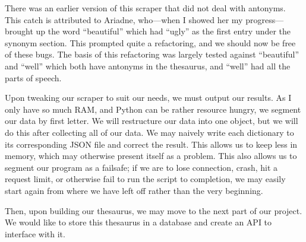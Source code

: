 \documentclass[11pt, twoside, reqno]{book}
\begin{document}
There was an earlier version of this scraper that did not deal with antonyms. This catch is attributed to Ariadne, who—when I showed her my progress—brought up the word ``beautiful'' which had ``ugly'' as the first entry under the synonym section. This prompted quite a refactoring, and we should now be free of these bugs. The basis of this refactoring was largely tested against ``beautiful'' and ``well'' which both have antonyms in the thesaurus, and ``well'' had all the parts of speech.

Upon tweaking our scraper to suit our needs, we must output our results. As I only have so much RAM, and Python can be rather resource hungry, we segment our data by first letter. We will restructure our data into one object, but we will do this after collecting all of our data. We may naively write each dictionary to its corresponding JSON file and correct the result. This allows us to keep less in memory, which may otherwise present itself as a problem. This also allows us to segment our program as a failsafe; if we are to lose connection, crash, hit a request limit, or otherwise fail to run the script to completion, we may easily start again from where we have left off rather than the very beginning.

Then, upon building our thesaurus, we may move to the next part of our project. We would like to store this thesaurus in a database and create an API to interface with it.
\end{document}
